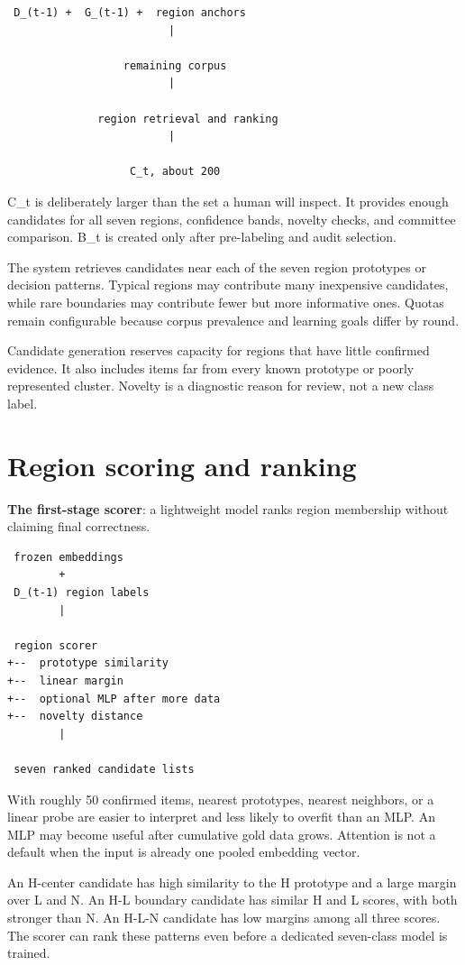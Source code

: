 \begin{verbatim}
 D_(t-1) +  G_(t-1) +  region anchors
                         |

                  remaining corpus
                         |

              region retrieval and ranking
                         |

                   C_t, about 200
\end{verbatim}
C_t is deliberately larger than the set a human will inspect. It provides enough candidates for all seven regions, confidence bands, novelty checks, and committee comparison. B_t is created only after pre-labeling and audit selection.

The system retrieves candidates near each of the seven region prototypes or decision patterns. Typical regions may contribute many inexpensive candidates, while rare boundaries may contribute fewer but more informative ones. Quotas remain configurable because corpus prevalence and learning goals differ by round.

Candidate generation reserves capacity for regions that have little confirmed evidence. It also includes items far from every known prototype or poorly represented cluster. Novelty is a diagnostic reason for review, not a new class label.


\section{Region scoring and ranking}
\textbf{The first-stage scorer}: a lightweight model ranks region membership without claiming final correctness.

\begin{verbatim}
 frozen embeddings
        +
 D_(t-1) region labels
        |

 region scorer
+--  prototype similarity
+--  linear margin
+--  optional MLP after more data
+--  novelty distance
        |

 seven ranked candidate lists
\end{verbatim}
With roughly 50 confirmed items, nearest prototypes, nearest neighbors, or a linear probe are easier to interpret and less likely to overfit than an MLP. An MLP may become useful after cumulative gold data grows. Attention is not a default when the input is already one pooled embedding vector.

An H-center candidate has high similarity to the H prototype and a large margin over L and N. An H-L boundary candidate has similar H and L scores, with both stronger than N. An H-L-N candidate has low margins among all three scores. The scorer can rank these patterns even before a dedicated seven-class model is trained.

